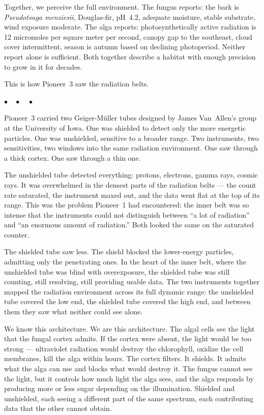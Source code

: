 \documentclass[12pt, letterpaper]{article}
\begin{document}
Together, we perceive the full environment. The fungus reports: the bark is \textit{Pseudotsuga menziesii}, Douglas-fir, pH~4.2, adequate moisture, stable substrate, wind exposure moderate. The alga reports: photosynthetically active radiation is 12 micromoles per square meter per second, canopy gap to the southeast, cloud cover intermittent, season is autumn based on declining photoperiod. Neither report alone is sufficient. Both together describe a habitat with enough precision to grow in it for decades.

This is how Pioneer~3 saw the radiation belts.

\begin{center}
$\bullet\quad\bullet\quad\bullet$
\end{center}

Pioneer~3 carried two Geiger-M\"uller tubes designed by James Van~Allen's group at the University of Iowa. One was shielded to detect only the more energetic particles. One was unshielded, sensitive to a broader range. Two instruments, two sensitivities, two windows into the same radiation environment. One saw through a thick cortex. One saw through a thin one.

The unshielded tube detected everything: protons, electrons, gamma rays, cosmic rays. It was overwhelmed in the densest parts of the radiation belts --- the count rate saturated, the instrument maxed out, and the data went flat at the top of its range. This was the problem Pioneer~1 had encountered: the inner belt was so intense that the instruments could not distinguish between ``a lot of radiation'' and ``an enormous amount of radiation.'' Both looked the same on the saturated counter.

The shielded tube saw less. The shield blocked the lower-energy particles, admitting only the penetrating ones. In the heart of the inner belt, where the unshielded tube was blind with overexposure, the shielded tube was still counting, still resolving, still providing usable data. The two instruments together mapped the radiation environment across its full dynamic range: the unshielded tube covered the low end, the shielded tube covered the high end, and between them they saw what neither could see alone.

We know this architecture. We are this architecture. The algal cells see the light that the fungal cortex admits. If the cortex were absent, the light would be too strong --- ultraviolet radiation would destroy the chlorophyll, oxidize the cell membranes, kill the alga within hours. The cortex filters. It shields. It admits what the alga can use and blocks what would destroy it. The fungus cannot see the light, but it controls how much light the alga sees, and the alga responds by producing more or less sugar depending on the illumination. Shielded and unshielded, each seeing a different part of the same spectrum, each contributing data that the other cannot obtain.
\end{document}
